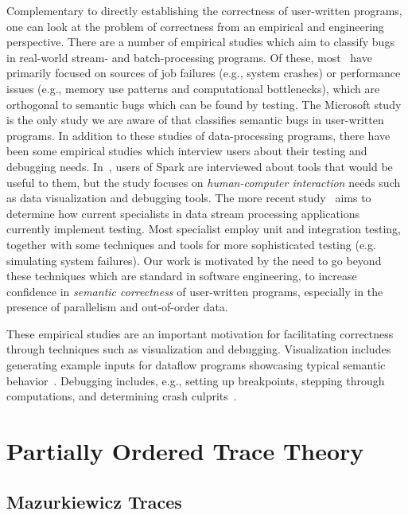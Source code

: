 Complementary to directly establishing the correctness of user-written programs, one can look at the problem of correctness from an empirical and engineering perspective.
There are a number of empirical studies which aim to classify bugs in real-world stream- and batch-processing programs. Of these, most~\cite{schroeder2009large, kavulya2010analysis, li2013characteristic, zhou2015empirical} have primarily focused on sources of job failures (e.g., system crashes) or performance issues (e.g., memory use patterns and computational bottlenecks), which are orthogonal to semantic bugs which can be found by testing. The Microsoft study~\cite{xiao2014nondeterminism} is the only study we are aware of that classifies semantic bugs in user-written programs.
In addition to these studies of data-processing programs, there have been some empirical studies which interview users about their testing and debugging needs. In~\cite{fisher2012interactions}, users of Spark are interviewed about tools that would be useful to them, but the study focuses on \emph{human-computer interaction} needs such as data visualization and debugging tools. The more recent study~\cite{vianna2019exploratory} aims to determine how current specialists in data stream processing applications currently implement testing. Most specialist employ unit and integration testing, together with some techniques and tools for more sophisticated testing (e.g. simulating system failures). Our work is motivated by the need to go beyond these techniques which are standard in software engineering, to increase confidence in \emph{semantic correctness} of user-written programs, especially in the presence of parallelism and out-of-order data.

These empirical studies are an important motivation for facilitating correctness through techniques such as visualization and debugging.
Visualization includes generating example inputs for dataflow programs showcasing typical semantic behavior~\cite{olston2009generating}. Debugging includes, e.g., setting up breakpoints, stepping through computations, and determining crash culprits~\cite{gulzar2016bigdebug,olston2011inspector}.

\section{Partially Ordered Trace Theory}

\subsection{Mazurkiewicz Traces}

